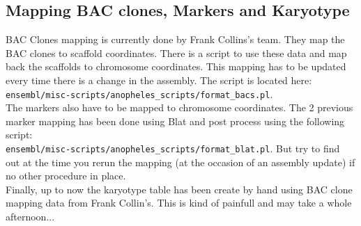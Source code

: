 \documentclass[a4paper,10pt]{article}
\begin{document}
\subsection{Mapping BAC clones, Markers and Karyotype}
BAC Clones mapping is currently done by Frank Collins's team. They map the BAC clones to scaffold coordinates. There is a script to use these data and map back the scaffolds to chromosome coordinates. This mapping has to be updated every time there is a change in the assembly. The script is located here:\\
 \texttt{ensembl/misc-scripts/anopheles\_scripts/format\_bacs.pl}.\\
The markers also have to be mapped to chromosome coordinates. The 2 previous marker mapping has been done using Blat and post process using the following script: \\
\texttt{ensembl/misc-scripts/anopheles\_scripts/format\_blat.pl}. But try to find out at the time you rerun the mapping (at the occasion of an assembly update) if no other procedure in place.\\
Finally, up to now the karyotype table has been create by hand using BAC clone mapping data from Frank Collin's. This is kind of painfull and may take a whole afternoon...
\end{document}
